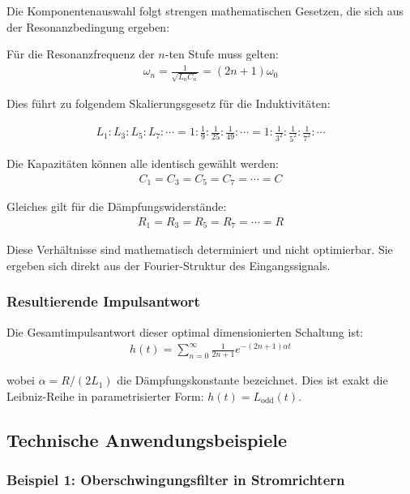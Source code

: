 \documentclass[a4paper, 12pt, twoside, openright]{report}
\theoremstyle{definition}
\theoremstyle{definition}
\begin{document}
Die Komponentenauswahl folgt strengen mathematischen Gesetzen, die sich aus der Resonanzbedingung ergeben:

Für die Resonanzfrequenz der $n$-ten Stufe muss gelten:
\begin{align}
	\omega_n = \frac{1}{\sqrt{L_n C_n}} = (2n+1) \omega_0
\end{align}

Dies führt zu folgendem Skalierungsgesetz für die Induktivitäten:

\begin{align}
	L_1 : L_3 : L_5 : L_7 : \cdots = 1 : \frac{1}{9} : \frac{1}{25} : \frac{1}{49} : \cdots = 1 : \frac{1}{3^2} : \frac{1}{5^2} : \frac{1}{7^2} : \cdots
\end{align}

Die Kapazitäten können alle identisch gewählt werden:
\begin{align}
	C_1 = C_3 = C_5 = C_7 = \cdots = C
\end{align}

Gleiches gilt für die Dämpfungswiderstände:
\begin{align}
	R_1 = R_3 = R_5 = R_7 = \cdots = R
\end{align}

Diese Verhältnisse sind mathematisch determiniert und nicht optimierbar. Sie ergeben sich direkt aus der Fourier-Struktur des Eingangssignals.

\subsubsection*{Resultierende Impulsantwort}

Die Gesamtimpulsantwort dieser optimal dimensionierten Schaltung ist:
\begin{align}
	h(t) = \sum_{n=0}^{\infty} \frac{1}{2n+1} e^{-(2n+1)\alpha t}
\end{align}

wobei $\alpha = R/(2L_1)$ die Dämpfungskonstante bezeichnet. Dies ist exakt die Leibniz-Reihe in parametrisierter Form: $h(t) = L_{\text{odd}}(t)$.

\subsection{Technische Anwendungsbeispiele}

\subsubsection*{Beispiel 1: Oberschwingungsfilter in Stromrichtern}
\end{document}
